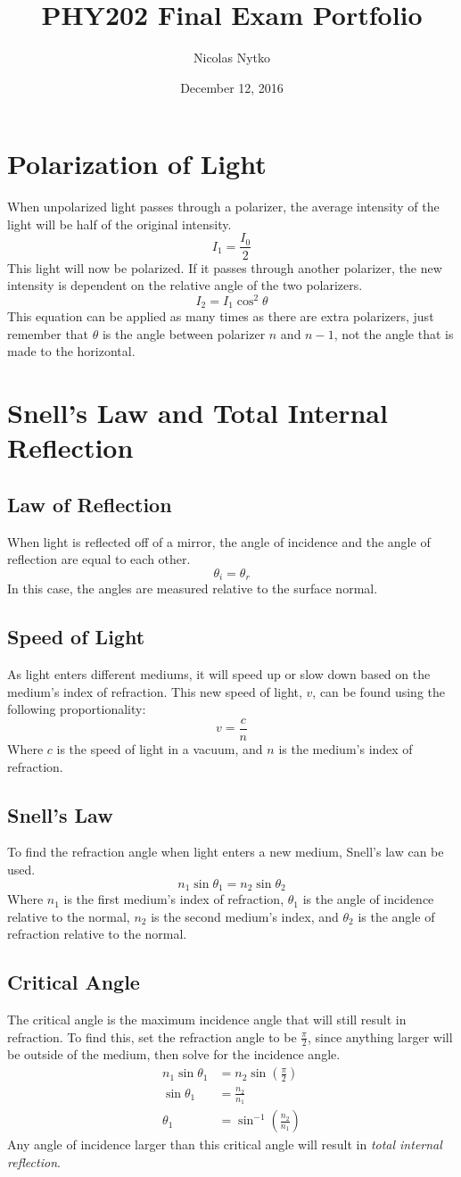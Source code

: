 \documentclass{article}
\title{PHY202 Final Exam Portfolio}
\author{Nicolas Nytko}
\date{December 12, 2016}
\begin{document}
\maketitle
\newpage
\section{Polarization of Light}
When unpolarized light passes through a polarizer, the average intensity of the light will be half of the original intensity.
\[ I_1 = \frac{I_0}{2} \]
This light will now be polarized.  If it passes through another polarizer, the new intensity is dependent on the relative angle of the two polarizers.
\[ I_2 = I_1 \cos^2 \theta \]
This equation can be applied as many times as there are extra polarizers, just remember that $\theta$ is the angle between polarizer $n$ and $n-1$, not the angle that is made to the horizontal.
\section{Snell's Law and Total Internal Reflection}
\subsection{Law of Reflection}
When light is reflected off of a mirror, the angle of incidence and the angle of reflection are equal to each other.
\[ \theta_i = \theta_r \]
In this case, the angles are measured relative to the surface normal.
\subsection{Speed of Light}
As light enters different mediums, it will speed up or slow down based on the medium's index of refraction.  This new speed of light, $v$, can be found using the following proportionality:
\[v=\frac{c}{n}\]
Where $c$ is the speed of light in a vacuum, and $n$ is the medium's index of refraction.
\subsection{Snell's Law}
To find the refraction angle when light enters a new medium, Snell's law can be used.
\[n_1\sin\theta_1=n_2\sin\theta_2\]
Where $n_1$ is the first medium's index of refraction, $\theta_1$ is the angle of incidence relative to the normal, $n_2$ is the second medium's index, and $\theta_2$ is the angle of refraction relative to the normal.
\subsection{Critical Angle}
The critical angle is the maximum incidence angle that will still result in refraction.  To find this, set the refraction angle to be $\frac{\pi}{2}$, since anything larger will be outside of the medium, then solve for the incidence angle.
\begin{align*}
n_1\sin\theta_1&=n_2\sin\left(\frac{\pi}{2}\right) \\
\sin\theta_1&=\frac{n_2}{n_1} \\
\theta_1&=\sin^{-1}\left(\frac{n_2}{n_1}\right)
\end{align*}
Any angle of incidence larger than this critical angle will result in \textit{total internal reflection}.
\end{document}
